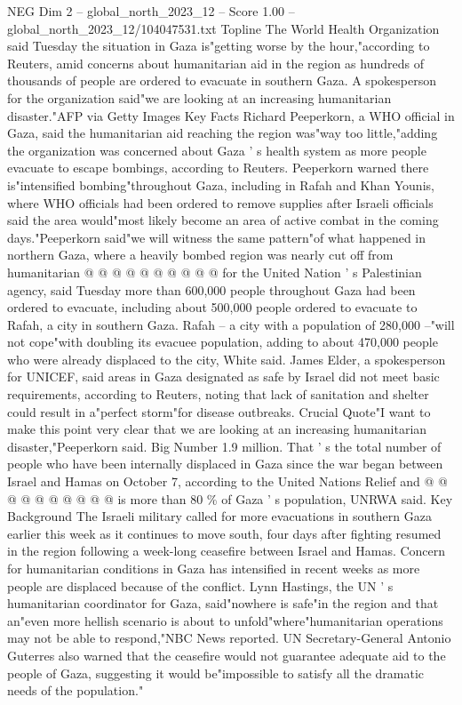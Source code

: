 \begin{textsample}{NEG Dim 2 – global\_north\_2023\_12 – Score 1.00 – global\_north\_2023\_12/104047531.txt}  \label{ex:f2_neg_213}
Topline The World Health Organization said Tuesday the situation in Gaza is"getting worse by the hour,"according to Reuters, amid concerns about humanitarian aid in the region as hundreds of thousands of people are ordered to evacuate in southern Gaza.
A spokesperson for the organization said"we are looking at an increasing humanitarian disaster."AFP via Getty Images Key Facts Richard Peeperkorn, a WHO official in Gaza, said the humanitarian aid reaching the region was"way too little,"adding the organization was concerned about Gaza ' s health system as more people evacuate to escape bombings, according to Reuters.
Peeperkorn warned there is"intensified bombing"throughout Gaza, including in Rafah and Khan Younis, where WHO officials had been ordered to remove supplies after Israeli officials said the area would"most likely become an area of active combat in the coming days."Peeperkorn said"we will witness the same pattern"of what happened in northern Gaza, where a heavily bombed region was nearly cut off from humanitarian @ @ @ @ @ @ @ @ @ @ for the United Nation ' s Palestinian agency, said Tuesday more than 600,000 people throughout Gaza had been ordered to evacuate, including about 500,000 people ordered to evacuate to Rafah, a city in southern Gaza.
Rafah -- a city with a population of 280,000 --"will not cope"with doubling its evacuee population, adding to about 470,000 people who were already displaced to the city, White said.
James Elder, a spokesperson for UNICEF, said areas in Gaza designated as safe by Israel did not meet basic requirements, according to Reuters, noting that lack of sanitation and shelter could result in a"perfect storm"for disease outbreaks.
Crucial Quote"I want to make this point very clear that we are looking at an increasing humanitarian disaster,"Peeperkorn said.
Big Number 1.9 million.
That ' s the total number of people who have been internally displaced in Gaza since the war began between Israel and Hamas on October 7, according to the United Nations Relief and @ @ @ @ @ @ @ @ @ @ is more than 80 \% of Gaza ' s population, UNRWA said.
Key Background The Israeli military called for more evacuations in southern Gaza earlier this week as it continues to move south, four days after fighting resumed in the region following a week-long ceasefire between Israel and Hamas.
Concern for humanitarian conditions in Gaza has intensified in recent weeks as more people are displaced because of the conflict.
Lynn Hastings, the UN ' s humanitarian coordinator for Gaza, said"nowhere is safe"in the region and that an"even more hellish scenario is about to unfold"where"humanitarian operations may not be able to respond,"NBC News reported.
UN Secretary-General Antonio Guterres also warned that the ceasefire would not guarantee adequate aid to the people of Gaza, suggesting it would be"impossible to satisfy all the dramatic needs of the population."

\end{textsample}
